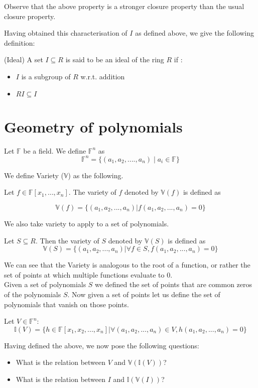 Observe that the above property is a stronger closure property than the usual closure property.


Having obtained this characterisation of $I$ as defined above, we give the following definition:
\begin{definition} (Ideal)
A set $I\subseteq R$ is said to be an ideal of the ring $R$ if :
\begin{itemize}
\item $I$ is a subgroup of $R$ w.r.t. addition
\item $RI \subseteq I$
\end{itemize}
\end{definition}

\section{Geometry of polynomials}
Let $\mathbb{F}$ be a field. We define $\mathbb{F}^n$ as 
\[
\mathbb{F}^n = \{(a_1,a_2,....,a_n) \mid a_i \in \mathbb{F}\}
\]

We define Variety ($\mathbb{V}$) as the following.

Let $f\in\mathbb{F}[x_1,\dots,x_n]$. The variety of $f$ denoted by $\mathbb{V}(f)$ is defined as

\begin{equation}
\mathbb{V}(f) = \{(a_1,a_2,...,a_n) | f(a_1,a_2,...,a_n)=0\}
\end{equation}

We also take variety to apply to a set of polynomials. 

Let $S \subseteq R$. Then the variety of $S$ denoted by $\mathbb{V}(S)$ is defined as 
\begin{equation}
\mathbb{V}(S) = \{(a_1,a_2,...,a_n) | \forall f \in S, f(a_1,a_2,...,a_n)=0\}
\end{equation}

We can see that the Variety is analogous to the root of a function, or rather the set of points at which multiple functions evaluate to 0.\\

Given a set of polynomials $S$ we defined the set of points that are common zeros of the polynomials $S$. Now given a set of points let us define the set of polynomials that vanish on those points. 



Let $V \in \mathbb{F}^n$:
\begin{equation}
\mathbb{I}(V) = \{h \in \mathbb{F}[x_1,x_2,...,x_n] | \forall (a_1,a_2,...,a_n) \in V, h(a_1,a_2,...,a_n) = 0 \}
\end{equation}


Having defined the above, we now pose the following questions:
\begin{itemize}
\item What is the relation between $V$ and $\mathbb{V}(\mathbb{I}(V))$?
\item What is the relation between $I$ and $\mathbb{I}(\mathbb{V}(I))$?
\end{itemize}









